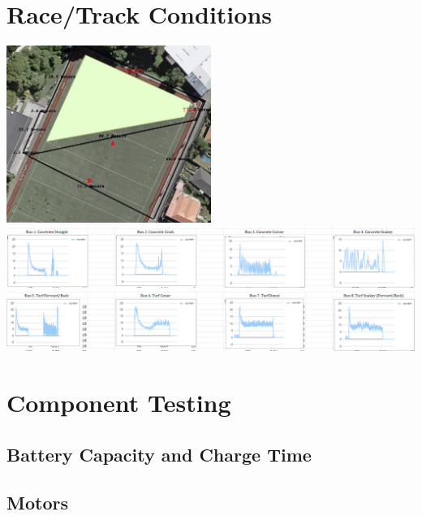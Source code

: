 \documentclass[11pt]{article}
\begin{document}
\section{Race/Track Conditions}
\begin{figure}
    
\end{figure}
\begin{center}
    \includegraphics[width=0.5\textwidth]{inc/tracks.png}
    \includegraphics[width=\textwidth]{inc/contrete_behaviour.png}
    \includegraphics[width=\textwidth]{inc/turf_behaviour.png}
\end{center}
\section{Component Testing}
\subsection{Battery Capacity and Charge Time}
\subsection{Motors}
\end{document}
